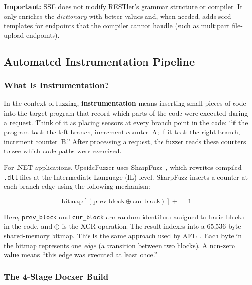 \documentclass[conference]{IEEEtran}
\begin{document}
\textbf{Important:} SSE does not modify RESTler's grammar structure or compiler. It only enriches the \emph{dictionary} with better values and, when needed, adds seed templates for endpoints that the compiler cannot handle (such as multipart file-upload endpoints).

\subsection{Automated Instrumentation Pipeline}
\label{sec:instrumentation}

\subsubsection{What Is Instrumentation?}

In the context of fuzzing, \textbf{instrumentation} means inserting small pieces of code into the target program that record which parts of the code were executed during a request. Think of it as placing sensors at every branch point in the code: ``if the program took the left branch, increment counter~A; if it took the right branch, increment counter~B.'' After processing a request, the fuzzer reads these counters to see which code paths were exercised.

For .NET applications, UpsideFuzzer uses SharpFuzz~\cite{sharpfuzz}, which rewrites compiled \texttt{.dll} files at the Intermediate Language (IL) level. SharpFuzz inserts a counter at each branch edge using the following mechanism:

\begin{equation}
  \text{bitmap}[(\text{prev\_block} \oplus \text{cur\_block})] \mathrel{+}= 1
  \label{eq:shm}
\end{equation}

Here, \texttt{prev\_block} and \texttt{cur\_block} are random identifiers assigned to basic blocks in the code, and $\oplus$ is the XOR operation. The result indexes into a 65,536-byte shared-memory bitmap. This is the same approach used by AFL~\cite{afl}. Each byte in the bitmap represents one \emph{edge} (a transition between two blocks). A non-zero value means ``this edge was executed at least once.''

\subsubsection{The 4-Stage Docker Build}
\end{document}
